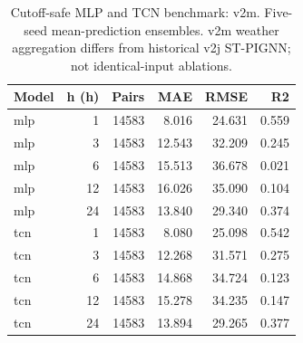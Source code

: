 \begin{table}[t]
\centering
\footnotesize
\caption{Cutoff-safe MLP and TCN benchmark: v2m. Five-seed mean-prediction ensembles. v2m weather aggregation differs from historical v2j ST-PIGNN; not identical-input ablations.}
\label{tab:t02b}
\begin{tabular}{lrrrrr}
\hline
Model & h (h) & Pairs & MAE & RMSE & R2 \\
\hline
mlp & 1 & 14583 & 8.016 & 24.631 & 0.559 \\
mlp & 3 & 14583 & 12.543 & 32.209 & 0.245 \\
mlp & 6 & 14583 & 15.513 & 36.678 & 0.021 \\
mlp & 12 & 14583 & 16.026 & 35.090 & 0.104 \\
mlp & 24 & 14583 & 13.840 & 29.340 & 0.374 \\
tcn & 1 & 14583 & 8.080 & 25.098 & 0.542 \\
tcn & 3 & 14583 & 12.268 & 31.571 & 0.275 \\
tcn & 6 & 14583 & 14.868 & 34.724 & 0.123 \\
tcn & 12 & 14583 & 15.278 & 34.235 & 0.147 \\
tcn & 24 & 14583 & 13.894 & 29.265 & 0.377 \\
\hline
\end{tabular}
\end{table}
